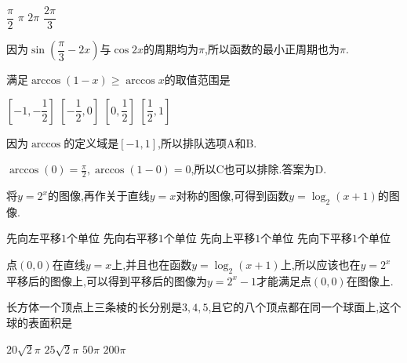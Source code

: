\documentclass[answers]{exam}
\begin{document}
\begin{questions}
	\begin{oneparchoices}
		\choice $\dfrac{\pi}{2}$
		\CorrectChoice $\pi$
		\choice $2\pi$
		\choice $\dfrac{2\pi}{3}$
	\end{oneparchoices}

	\begin{solution}
		因为$\sin \left( \dfrac{\pi}{3} -2x \right)$与$\cos2x$的周期均为$\pi$,所以函数的最小正周期也为$\pi$.
	\end{solution}

	\question 满足$\arccos(1-x) \geqslant \arccos{x}$的取值范围是 \hfs

	\begin{oneparchoices}
		\choice $\left[-1, -\dfrac12\right]$
		\choice $\left[-\dfrac12, 0\right]$
		\choice $\left[0, \dfrac12\right]$
		\CorrectChoice $\left[\dfrac12, 1\right]$
	\end{oneparchoices}

	\begin{solution}
		因为$\arccos$的定义域是$[-1,1]$,所以排队选项A和B.

		$\arccos(0) = \frac{\pi}{2}, \arccos(1-0)=0$,所以C也可以排除.答案为D.
	\end{solution}

	\question 将$y=2^x$的图像\underline{\hspace{.5cm}},再作关于直线$y=x$对称的图像,可得到函数$y=\log_2(x+1)$的图像. \hfs

	\begin{oneparchoices}
		\choice 先向左平移$1$个单位
		\choice 先向右平移$1$个单位
		\choice 先向上平移$1$个单位
		\CorrectChoice 先向下平移$1$个单位
	\end{oneparchoices}

	\begin{solution}
		点$(0,0)$在直线$y=x$上,并且也在函数$y=\log_2(x+1)$上,所以应该也在$y=2^x$平移后的图像上,可以得到平移后的图像为$y=2^x
			- 1$才能满足点$(0,0)$在图像上.
	\end{solution}

	\question 长方体一个顶点上三条棱的长分别是$3,4,5$,且它的八个顶点都在同一个球面上,这个球的表面积是

	\hfs

	\begin{oneparchoices}
		\choice $20\sqrt{2}\pi$
		\choice $25\sqrt{2}\pi$
		\CorrectChoice $50\pi$
		\choice $200\pi$
	\end{oneparchoices}

	\begin{solution}


\end{solution}
\end{questions}
\end{document}
